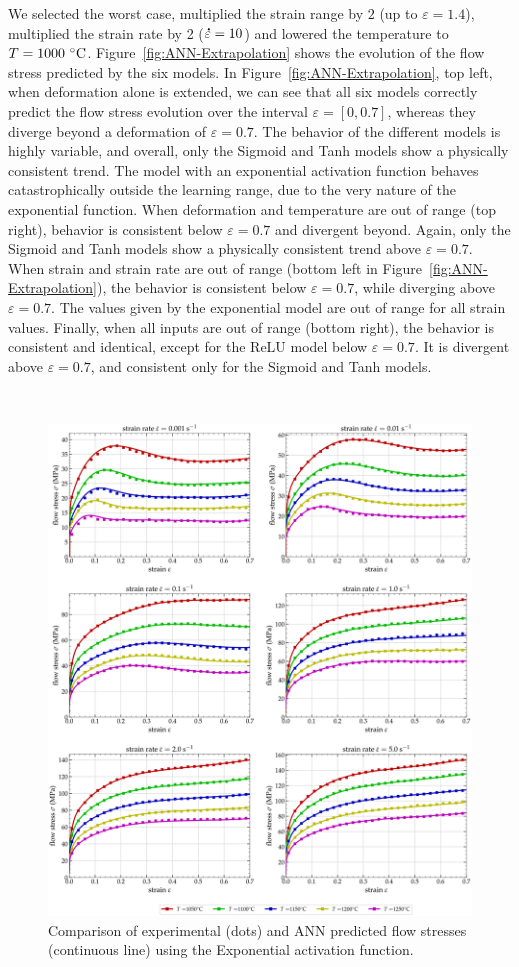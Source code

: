 \documentclass[algorithms,article,accept,pdftex,oneauthor]{Definitions/mdpi}
\DeclareRobustCommand{\mdot}[1]{\accentset{\mbox{\bfseries .}}{#1}}
\begin{document}
We selected the worst case, multiplied the strain range by $2$ (up to $\varepsilon=1.4$), multiplied the strain rate by 2 ($\mdot{\varepsilon}=10$) and lowered the temperature to $T=1000~\celsius$.
Figure~\ref{fig:ANN-Extrapolation} shows the evolution of the flow stress predicted by the six models.
In Figure~\ref{fig:ANN-Extrapolation}, top left, when deformation alone is extended, we can see that all six models correctly predict the flow stress evolution over the interval $\varepsilon=[0,0.7]$, whereas they diverge beyond a deformation of $\varepsilon=0.7$.
The behavior of the different models is highly variable, and overall, only the Sigmoid and Tanh models show a physically consistent trend.
The model with an exponential activation function behaves catastrophically outside the learning range, due to the very nature of the exponential function.
When deformation and temperature are out of range (top right), behavior is consistent below $\varepsilon=0.7$ and divergent beyond.
Again, only the Sigmoid and Tanh models show a physically consistent trend above $\varepsilon=0.7$.
When strain and strain rate are out of range (bottom left in Figure~\ref{fig:ANN-Extrapolation}), the behavior is consistent below $\varepsilon=0.7$, while diverging above $\varepsilon=0.7$.
The values given by the exponential model are out of range for all strain values.
Finally, when all inputs are out of range (bottom right), the behavior is consistent and identical, except for the ReLU model below $\varepsilon=0.7$.
It is divergent above $\varepsilon=0.7$, and consistent only for the Sigmoid and Tanh models.
\begin{figure}[H]
\

\includegraphics[width=0.97\columnwidth]{Figures/3Cr2Mo-3-15-7-1-exponential}
\caption{Comparison of experimental (dots) and ANN predicted flow stresses (continuous line) using the Exponential activation function.}
\label{fig:ANN-ExpFit}
\end{figure}
\end{document}

